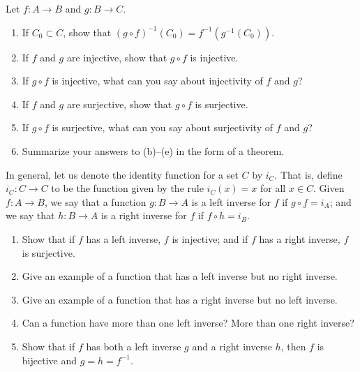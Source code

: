   \begin{exercise}[Munkres 2.4]
    Let $f: A \to B$ and $g: B \to C$.
    \begin{enumerate}
      \item If $C_0 \subset C$, show that $(g \circ f)^{-1}(C_0) = f^{-1}(g^{-1}(C_0))$.
      \item If $f$ and $g$ are injective, show that $g \circ f$ is injective.
      \item If $g \circ f$ is injective, what can you say about injectivity of $f$ and $g$?
      \item If $f$ and $g$ are surjective, show that $g \circ f$ is surjective.
      \item If $g \circ f$ is surjective, what can you say about surjectivity of $f$ and $g$?
      \item Summarize your answers to (b)--(e) in the form of a theorem.
    \end{enumerate}
  \end{exercise}
  \begin{solution}
    
  \end{solution}

  \begin{exercise}[Munkres 2.5]
    In general, let us denote the identity function for a set $C$ by $i_C$. That is, define $i_C: C \to C$ to be the function given by the rule $i_C(x) = x$ for all $x \in C$. Given $f: A \to B$, we say that a function $g: B \to A$ is a left inverse for $f$ if $g \circ f = i_A$; and we say that $h: B \to A$ is a right inverse for $f$ if $f \circ h = i_B$.
    \begin{enumerate}
      \item Show that if $f$ has a left inverse, $f$ is injective; and if $f$ has a right inverse, $f$ is surjective.
      \item Give an example of a function that has a left inverse but no right inverse.
      \item Give an example of a function that has a right inverse but no left inverse.
      \item Can a function have more than one left inverse? More than one right inverse?
      \item Show that if $f$ has both a left inverse $g$ and a right inverse $h$, then $f$ is bijective and $g = h = f^{-1}$.
    \end{enumerate}
  \end{exercise}
  \begin{solution}
    
  \end{solution}

